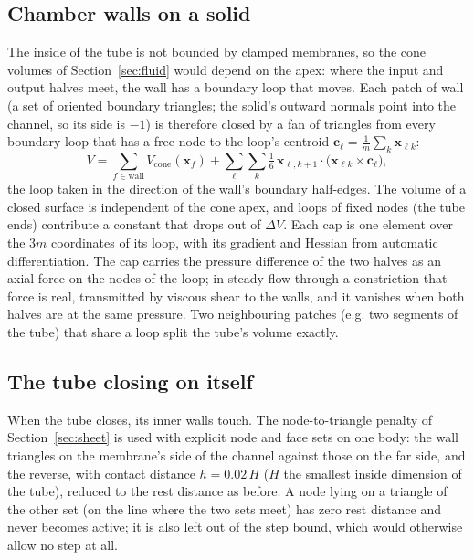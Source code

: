 \documentclass[11pt,a4paper]{article}
\theoremstyle{remark}
\begin{document}
\subsection{Chamber walls on a solid}
The inside of the tube is not bounded by clamped membranes, so the cone volumes of
Section~\ref{sec:fluid} would depend on the apex: where the input and output halves meet, the wall
has a boundary loop that moves. Each patch of wall (a set of oriented boundary triangles; the
solid's outward normals point into the channel, so its side is $-1$) is therefore closed by a fan
of triangles from every boundary loop that has a free node to the loop's centroid
$\bm c_\ell = \frac1{m}\sum_{k}\bm x_{\ell k}$:
\begin{equation}
  V = \sum_{f\in\text{wall}} V_\mathrm{cone}(\bm x_f)
    + \sum_{\ell}\sum_{k} \tfrac16\,\bm x_{\ell,k+1}\cdot\bigl(\bm x_{\ell k}\times\bm c_\ell\bigr),
\end{equation}
the loop taken in the direction of the wall's boundary half-edges. The volume of a closed surface
is independent of the cone apex, and loops of fixed nodes (the tube ends) contribute a constant
that drops out of $\Delta V$. Each cap is one element over the $3m$ coordinates of its loop, with
its gradient and Hessian from automatic differentiation. The cap carries the pressure difference of
the two halves as an axial force on the nodes of the loop; in steady flow through a constriction
that force is real, transmitted by viscous shear to the walls, and it vanishes when both halves are
at the same pressure. Two neighbouring patches (e.g. two segments of the tube) that share a loop split the tube's volume
exactly.

\subsection{The tube closing on itself}
When the tube closes, its inner walls touch. The node-to-triangle penalty of
Section~\ref{sec:sheet} is used with explicit node and face sets on one body: the wall triangles on
the membrane's side of the channel against those on the far side, and the reverse, with contact
distance $h = 0.02\,H$ ($H$ the smallest inside dimension of the tube), reduced to the rest
distance as before. A node lying on a triangle of the other set (on the line where the two sets
meet) has zero rest distance and never becomes active; it is also left out of the step bound,
which would otherwise allow no step at all.
\end{document}

